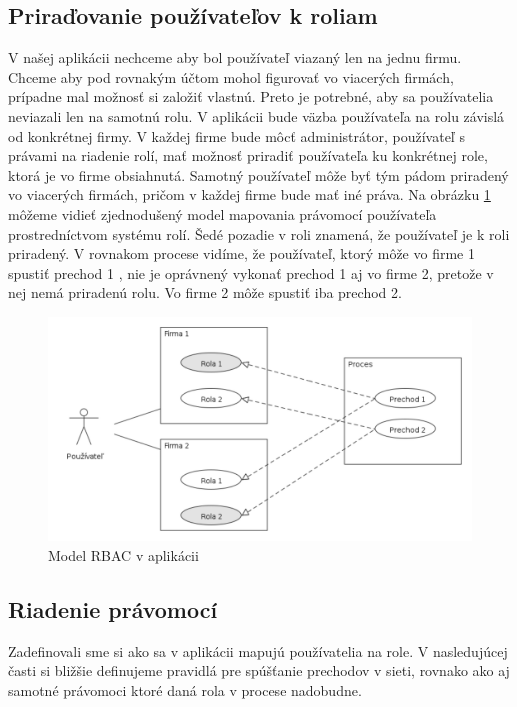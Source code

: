 \subsection{Priraďovanie používateľov k roliam}
V našej aplikácii nechceme aby bol používateľ viazaný len na jednu firmu. Chceme aby pod rovnakým účtom mohol figurovať vo viacerých firmách, prípadne mal možnosť si založiť vlastnú. Preto je potrebné, aby sa používatelia neviazali len na samotnú rolu. V aplikácii bude väzba používateľa na rolu závislá od konkrétnej firmy. V každej firme bude môcť administrátor, používateľ s právami na riadenie rolí, mať možnosť priradiť používateľa ku konkrétnej role, ktorá je vo firme obsiahnutá. Samotný používateľ môže byť tým pádom priradený vo viacerých firmách, pričom v každej firme bude mať iné práva. Na obrázku  \ref{fig:user_to_roles} môžeme vidieť zjednodušený model mapovania právomocí používateľa prostredníctvom systému rolí.
Šedé pozadie v roli znamená, že používateľ je k roli priradený.  V rovnakom procese vidíme, že používateľ, ktorý môže vo firme 1 spustiť prechod 1 , nie je oprávnený vykonať prechod 1 aj vo firme 2, pretože v nej nemá priradenú rolu. Vo firme 2 môže spustiť iba prechod 2.

\begin{figure}[h]
	\centering
	\includegraphics[width=0.9\linewidth]{images/user_to_roles}
	\caption{ Model RBAC v aplikácii}
	\label{fig:user_to_roles}
\end{figure}


\subsection{Riadenie právomocí}	
Zadefinovali sme si ako sa v aplikácii mapujú používatelia na role. V nasledujúcej časti si bližšie definujeme pravidlá pre spúšťanie prechodov v sieti, rovnako ako aj samotné právomoci ktoré daná rola v procese nadobudne. 



